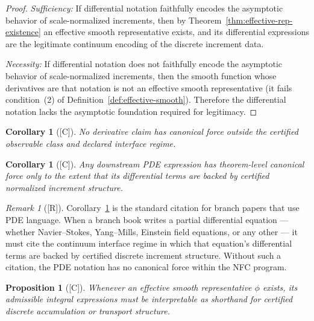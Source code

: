 \documentclass[12pt,oneside]{amsbook}
\theoremstyle{plain}
\newtheorem{proposition}[theorem]{Proposition}
\newtheorem{corollary}[theorem]{Corollary}
\theoremstyle{definition}
\theoremstyle{remark}
\newtheorem{remark}[theorem]{Remark}
\newcommand{\status}[1]{\textup{[#1]}}
\begin{document}
\begin{proof}
\emph{Sufficiency:} If differential notation faithfully encodes the
asymptotic behavior of scale-normalized increments, then by
Theorem~\ref{thm:effective-rep-existence} an effective smooth
representative exists, and its differential expressions are the
legitimate continuum encoding of the discrete increment data.

\emph{Necessity:} If differential notation does not faithfully encode
the asymptotic behavior of scale-normalized increments, then the
smooth function whose derivatives are that notation is not an effective
smooth representative (it fails condition~(2) of
Definition~\ref{def:effective-smooth}).  Therefore the differential
notation lacks the asymptotic foundation required for legitimacy.
\end{proof}

\begin{corollary}[\status{C}]\label{cor:no-derivative-outside-regime}
No derivative claim has canonical force outside the certified
observable class and declared interface regime.
\end{corollary}

\begin{corollary}[\status{C}]\label{cor:PDE-backed-by-increments}
Any downstream PDE expression has theorem-level canonical force only
to the extent that its differential terms are backed by certified
normalized increment structure.
\end{corollary}

\begin{remark}[\status{R}]\label{rmk:PDE-citation}
Corollary~\ref{cor:PDE-backed-by-increments} is the standard citation
for branch papers that use PDE language.  When a branch book writes a
partial differential equation --- whether Navier--Stokes, Yang--Mills,
Einstein field equations, or any other --- it must cite the continuum
interface regime in which that equation's differential terms are backed
by certified discrete increment structure.  Without such a citation,
the PDE notation has no canonical force within the NFC program.
\end{remark}

\begin{proposition}[\status{C}]\label{prop:integral-shorthand}
Whenever an effective smooth representative $\phi$ exists, its
admissible integral expressions must be interpretable as shorthand for
certified discrete accumulation or transport structure.
\end{proposition}
\end{document}
